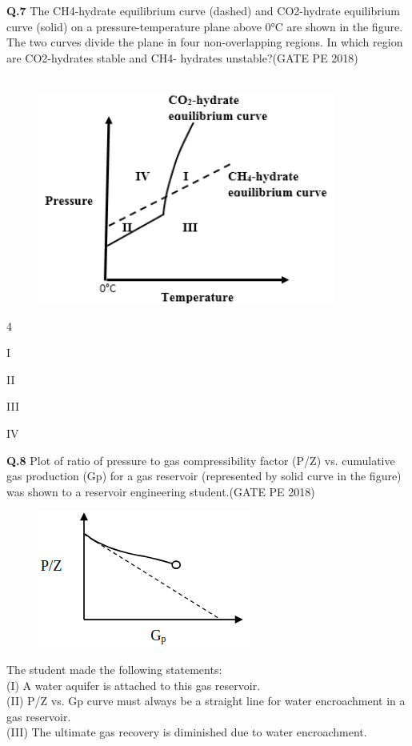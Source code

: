 \documentclass[journal,12pt,onecolumn]{IEEEtran}
\theoremstyle{remark}
\begin{document}
\pagebreak

\noindent
\textbf{Q.7} The CH4-hydrate equilibrium curve (dashed) and CO2-hydrate equilibrium curve (solid) on
a pressure-temperature plane above 0°C are shown in the figure. The two curves divide the
plane in four non-overlapping regions. In which region are CO2-hydrates stable and CH4-
hydrates unstable?\hfill(GATE PE 2018)\\\\

\begin{figure}[h!]
  \centering
  \includegraphics[width=0.4\columnwidth]{pic3.png} 
\end{figure}

	\begin{enumerate}
\end{enumerate}


\noindent
\textbf{Q.8} Plot of ratio of pressure to gas compressibility factor (P/Z) vs. cumulative gas production
(Gp) for a gas reservoir (represented by solid curve in the figure) was shown to a reservoir
engineering student.\hfill(GATE PE 2018)

\begin{figure}[h!]
  \centering
  \includegraphics[width=0.4\columnwidth]{pic4.png} 
\end{figure}
\noindent
The student made the following statements:\\
(I) A water aquifer is attached to this gas reservoir.\\
(II) P/Z vs. Gp curve must always be a straight line for water encroachment in a gas
reservoir.\\
(III) The ultimate gas recovery is diminished due to water encroachment.\\
\end{document}
